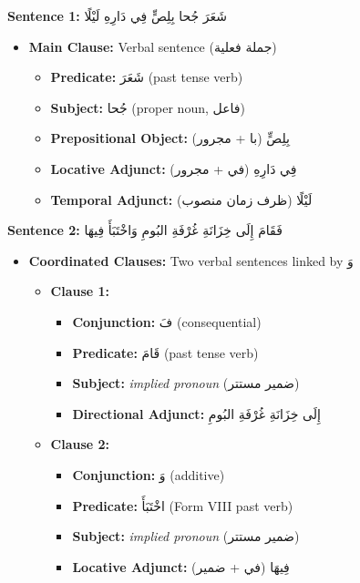 \documentclass[letter,12pt]{article}
\begin{document}
\begin{tcolorbox}[colback=boxcolor,colframe=headercolor,title=\textbf{Syntactic Tree Structure},breakable]
\textbf{Sentence 1:} \textarabic{شَعَرَ جُحا بِلِصٍّ فِي دَارِهِ لَيْلًا}

\begin{itemize}
\item \textbf{Main Clause:} Verbal sentence (جملة فعلية)
  \begin{itemize}
  \item \textbf{Predicate:} \textarabic{شَعَرَ} (past tense verb)
  \item \textbf{Subject:} \textarabic{جُحا} (proper noun, فاعل)
  \item \textbf{Prepositional Object:} \textarabic{بِلِصٍّ} (با + مجرور)
  \item \textbf{Locative Adjunct:} \textarabic{فِي دَارِهِ} (في + مجرور)
  \item \textbf{Temporal Adjunct:} \textarabic{لَيْلًا} (ظرف زمان منصوب)
  \end{itemize}
\end{itemize}

\textbf{Sentence 2:} \textarabic{فَقَامَ إِلَى خِزَانَةِ غُرْفَةِ البُومِ وَاخْتَبَأَ فِيهَا}

\begin{itemize}
\item \textbf{Coordinated Clauses:} Two verbal sentences linked by \textarabic{وَ}
  \begin{itemize}
  \item \textbf{Clause 1:}
    \begin{itemize}
    \item \textbf{Conjunction:} \textarabic{فَ} (consequential)
    \item \textbf{Predicate:} \textarabic{قَامَ} (past tense verb)
    \item \textbf{Subject:} \textit{implied pronoun} (ضمير مستتر)
    \item \textbf{Directional Adjunct:} \textarabic{إِلَى خِزَانَةِ غُرْفَةِ البُومِ}
    \end{itemize}
  \item \textbf{Clause 2:}
    \begin{itemize}
    \item \textbf{Conjunction:} \textarabic{وَ} (additive)
    \item \textbf{Predicate:} \textarabic{اخْتَبَأَ} (Form VIII past verb)
    \item \textbf{Subject:} \textit{implied pronoun} (ضمير مستتر)
    \item \textbf{Locative Adjunct:} \textarabic{فِيهَا} (في + ضمير)
    \end{itemize}
  \end{itemize}
\end{itemize}
\end{tcolorbox}
\end{document}
